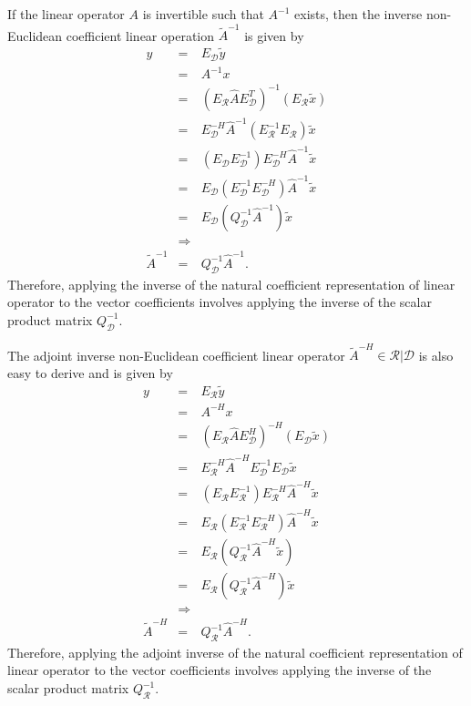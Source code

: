 \documentclass[pdf,ps2pdf,11pt]{SANDreport}
\begin{document}
If the linear operator $A$ is invertible such that $A^{-1}$ exists, then the
inverse non-Euclidean coefficient linear operation $\tilde{A}^{-1}$ is given
by
%
\begin{eqnarray}
y
& = & E_{\mathcal{D}} \tilde{y} \nonumber \\
& = & A^{-1} x \nonumber \\
& = & (E_{\mathcal{R}} \hat{A} E_{\mathcal{D}}^T)^{-1} (E_{\mathcal{R}} \tilde{x}) \nonumber \\
& = & E_{\mathcal{D}}^{-H} \hat{A}^{-1} (E_{\mathcal{R}}^{-1} E_{\mathcal{R}}) \tilde{x}  \nonumber \\
& = & ( E_{\mathcal{D}} E_{\mathcal{D}}^{-1} ) E_{\mathcal{D}}^{-H} \hat{A}^{-1} \tilde{x}  \nonumber \\
& = & E_{\mathcal{D}} (E_{\mathcal{D}}^{-1} E_{\mathcal{D}}^{-H}) \hat{A}^{-1} \tilde{x}  \nonumber \\
& = & E_{\mathcal{D}} ( Q_{\mathcal{D}}^{-1} \hat{A}^{-1} ) \tilde{x} \nonumber \\
& \Rightarrow &  \nonumber \\
\tilde{A}^{-1} & = & Q_{\mathcal{D}}^{-1} \hat{A}^{-1}.
\label{eqn:A_natural_matrix_inverse_apply}
\end{eqnarray}
%
Therefore, applying the inverse of the natural coefficient representation of
linear operator to the vector coefficients involves applying the inverse of
the scalar product matrix $Q_{\mathcal{D}}^{-1}$.

The adjoint inverse non-Euclidean coefficient linear operator
$\tilde{A}^{-H}\in\mathcal{R}|\mathcal{D}$ is also easy to derive and is given
by
%
\begin{eqnarray}
y
& = & E_{\mathcal{R}} \tilde{y} \nonumber \\
& = & A^{-H} x \nonumber \\
& = & (E_{\mathcal{R}} \hat{A} E_{\mathcal{D}}^H)^{-H} (E_{\mathcal{D}} \tilde{x}) \nonumber \\
& = & E_{\mathcal{R}}^{-H} \hat{A}^{-H} E_{\mathcal{D}}^{-1} E_{\mathcal{D}} \tilde{x}  \nonumber \\
& = & ( E_{\mathcal{R}} E_{\mathcal{R}}^{-1} ) E_{\mathcal{R}}^{-H} \hat{A}^{-H} \tilde{x}  \nonumber \\
& = & E_{\mathcal{R}} (E_{\mathcal{R}}^{-1} E_{\mathcal{R}}^{-H}) \hat{A}^{-H} \tilde{x}  \nonumber \\
& = & E_{\mathcal{R}} ( Q_{\mathcal{R}}^{-1} \hat{A}^{-H} \tilde{x} ) \nonumber \\
& = & E_{\mathcal{R}} ( Q_{\mathcal{R}}^{-1} \hat{A}^{-H} ) \tilde{x} \nonumber \\
& \Rightarrow &  \nonumber \\
\tilde{A}^{-H} & = & Q_{\mathcal{R}}^{-1} \hat{A}^{-H}.
\label{eqn:A_natural_matrix_adjoint_inverse_apply}
\end{eqnarray}
%
Therefore, applying the adjoint inverse of the natural coefficient
representation of linear operator to the vector coefficients involves applying
the inverse of the scalar product matrix $Q_{\mathcal{R}}^{-1}$.
\end{document}
